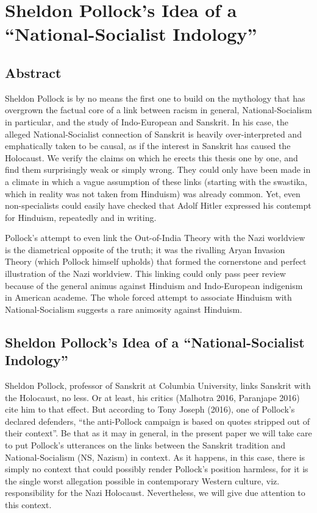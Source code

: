 \chapter[Pollock’s Idea of a “National-Socialist Indology”]{Sheldon Pollock’s Idea of a “National-Socialist Indology”}\label{chapter3}


\section*{Abstract}

Sheldon Pollock is by no means the first one to build on the mythology that has overgrown the factual core of a link between racism in general, National-Socialism in particular, and the study of Indo-European and Sanskrit. In his case, the alleged National-Socialist connection of Sanskrit is heavily over-interpreted and emphatically taken to be causal, as if the interest in Sanskrit has caused the Holocaust. We verify the claims on which he erects this thesis one by one, and find them surprisingly weak or simply wrong. They could only have been made in a climate in which a vague assumption of these links (starting with the swastika, which in reality was not taken from Hinduism) was already common. Yet, even non-specialists could easily have checked that Adolf Hitler expressed his contempt for Hinduism, repeatedly and in writing.

Pollock’s attempt to even link the Out-of-India Theory with the Nazi worldview is the diametrical opposite of the truth; it was the rivalling Aryan Invasion Theory (which Pollock himself upholds) that formed the cornerstone and perfect illustration of the Nazi worldview. This linking could only pass peer review because of the general animus against Hinduism and Indo-European indigenism in American academe. The whole forced attempt to associate Hinduism with National-Socialism suggests a rare animosity against Hinduism.  

\section*{Sheldon Pollock’s Idea of a “National-Socialist Indology”}

Sheldon Pollock, professor of Sanskrit at Columbia University, links Sanskrit with the Holocaust, no less. Or at least, his critics (Malhotra 2016, Paranjape 2016) cite him to that effect. But according to Tony Joseph (2016), one of Pollock’s declared defenders, “the anti-Pollock campaign is based on quotes stripped out of their context”. Be that as it may in general, in the present paper we will take care to put Pollock’s utterances on the links between the Sanskrit tradition and National-Socialism (NS, Nazism) in context. As it happens, in this case, there is simply no context that could possibly render Pollock’s position harmless, for it is the single worst allegation possible in contemporary Western culture, viz. responsibility for the Nazi Holocaust. Nevertheless, we will give due attention to this context.

